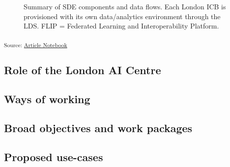 \documentclass[
  letterpaper,
  DIV=11,
  numbers=noendperiod]{scrartcl}
\begin{document}
\begin{figure}


\caption{\label{fig-sde-summary}Summary of SDE components and data
flows. Each London ICB is provisioned with its own data/analytics
environment through the LDS. FLIP = Federated Learning and
Interoperability Platform.}

\end{figure}%

\textsubscript{Source:
\href{https://d3london.github.io/sde_aic_docs/index.qmd.html}{Article
Notebook}}

\subsection{Role of the London AI
Centre}\label{role-of-the-london-ai-centre}

\subsection{Ways of working}\label{ways-of-working}

\subsection{Broad objectives and work
packages}\label{broad-objectives-and-work-packages}

\subsection{Proposed use-cases}\label{proposed-use-cases}
\end{document}
